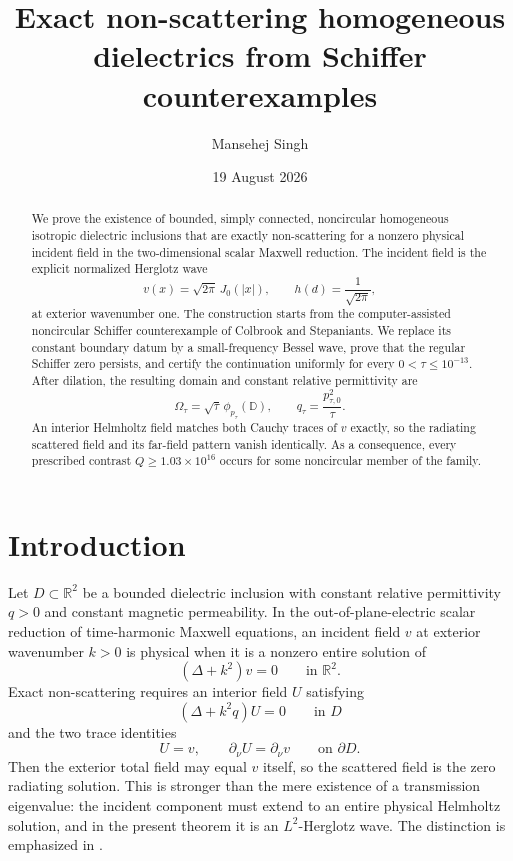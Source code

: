 \documentclass[11pt]{amsart}
\title[Exact non-scattering dielectrics from Schiffer counterexamples]
{Exact non-scattering homogeneous dielectrics from Schiffer counterexamples}
\author{Mansehej Singh}
\date{19 August 2026}
\newcommand{\D}{\mathbb D}
\newcommand{\R}{\mathbb R}
\newcommand{\abs}[1]{\left\lvert #1\right\rvert}
\begin{document}
\begin{abstract}
We prove the existence of bounded, simply connected, noncircular homogeneous
isotropic dielectric inclusions that are exactly non-scattering for a
nonzero physical incident field in the two-dimensional scalar Maxwell
reduction.  The incident field is the explicit normalized Herglotz wave
\[
  v(x)=\sqrt{2\pi}\,J_0(\abs{x}),
  \qquad h(d)=\frac1{\sqrt{2\pi}},
\]
at exterior wavenumber one.  The construction starts from the
computer-assisted noncircular Schiffer counterexample of Colbrook and
Stepaniants.  We replace its constant boundary datum by a small-frequency
Bessel wave, prove that the regular Schiffer zero persists, and certify the
continuation uniformly for every $0<\tau\le10^{-13}$.  After dilation, the
resulting domain and constant relative permittivity are
\[
  \Omega_\tau=\sqrt\tau\,\phi_{p_\tau}(\D),
  \qquad q_\tau=\frac{p_{\tau,0}^2}{\tau}.
\]
An interior Helmholtz field matches both Cauchy traces of $v$ exactly, so the
radiating scattered field and its far-field pattern vanish identically.  As
a consequence, every prescribed contrast $Q\ge1.03\times10^{16}$ occurs for
some noncircular member of the family.
\end{abstract}

\maketitle

\section{Introduction}

Let $D\subset\R^2$ be a bounded dielectric inclusion with constant relative
permittivity $q>0$ and constant magnetic permeability.  In the
out-of-plane-electric scalar reduction of time-harmonic Maxwell equations,
an incident field $v$ at exterior wavenumber $k>0$ is physical when it is a
nonzero entire solution of
\begin{equation}\label{eq:incident}
  (\Delta+k^2)v=0\qquad\text{in }\R^2.
\end{equation}
Exact non-scattering requires an interior field $U$ satisfying
\begin{equation}\label{eq:interior}
  (\Delta+k^2q)U=0\qquad\text{in }D
\end{equation}
and the two trace identities
\begin{equation}\label{eq:traces}
  U=v,
  \qquad
  \partial_\nu U=\partial_\nu v
  \qquad\text{on }\partial D.
\end{equation}
Then the exterior total field may equal $v$ itself, so the scattered field is
the zero radiating solution.  This is stronger than the mere existence of a
transmission eigenvalue: the incident component must extend to an entire
physical Helmholtz solution, and in the present theorem it is an
$L^2$-Herglotz wave.  The distinction is emphasized in
\cite{HovsepyanVogelius2025,CakoniVogelius2026}.
\end{document}
